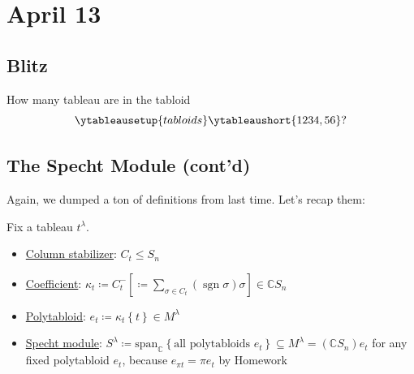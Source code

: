\documentclass[12pt]{article}
\newcommand{\cx}{\mathbb{C}}
\newcommand\paren[1]{\left( #1 \right)}
\newcommand\setb[1]{\left \{ #1 \right \}}
\newcommand{\spank}[1]{\mathrm{span}_{#1}}
\theoremstyle{definition}
\DeclareMathOperator\sgn{sgn}
\begin{document}
\section{April 13}
\subsection{Blitz}
How many tableau are in the tabloid
\[
    \ytableausetup{tabloids}
    \ytableaushort{1234,56}
    ?
\]
\subsection{The Specht Module (cont'd)}
Again, we dumped a ton of definitions from last time. Let's recap them:

Fix a tableau $t^{\lambda}$.
\begin{itemize}
    \item \underline{Column stabilizer}: $C_t \leq S_n$
    \item \underline{Coefficient}: $\kappa_t \coloneqq  C_t^- \left[ \coloneqq  \sum\limits_{\sigma \in C_t} \paren{ \sgn \sigma } \sigma \right] \in \cx S_n$
    \item \underline{Polytabloid}: $e_t \coloneqq  \kappa_t \setb{t} \in M^{\lambda}$
    \item \underline{Specht module}: $S^{\lambda} \coloneqq  \spank{\cx} \setb{ \text{all polytabloids } e_t } \subseteq M^{\lambda} = \paren{ \cx S_n } e_t$ for any fixed polytabloid $e_t$, because $e_{\pi t} = \pi e_t$ by Homework
\end{itemize}
\end{document}
